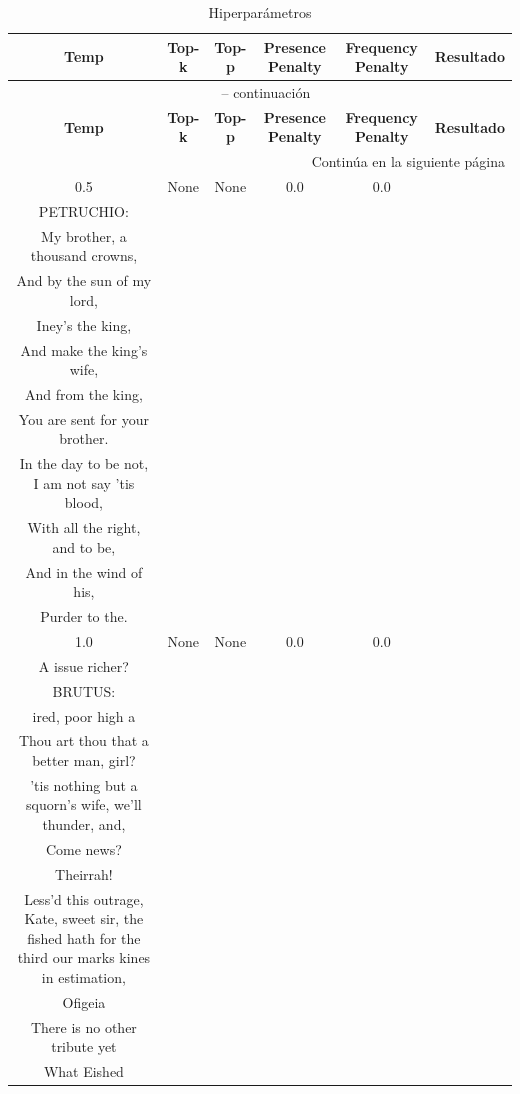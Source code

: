 \documentclass[11pt]{book}
\begin{document}
\begin{longtable}{ccccc >{\raggedright\arraybackslash}p{8cm}}
    \caption{Hiperparámetros}
    \label{tab:resultados_validacion_shakespeare} \\
    \toprule
    \textbf{Temp} & \textbf{Top-k} & \textbf{Top-p} &
    \textbf{Presence Penalty} & \textbf{Frequency Penalty} & \textbf{Resultado} \\
    \midrule
    \endfirsthead
    
    \multicolumn{6}{c}{{\tablename\ \thetable{} -- continuación}} \\
    \toprule
    \textbf{Temp} & \textbf{Top-k} & \textbf{Top-p} &
    \textbf{Presence Penalty} & \textbf{Frequency Penalty} & \textbf{Resultado} \\
    \midrule
    \endhead
    
    \bottomrule
    \multicolumn{6}{r}{{Continúa en la siguiente página}} \\
    \endfoot
    
    \bottomrule
    \endlastfoot
    
    0.5 & None & None & 0.0 & 0.0 &
    \begin{tcolorbox}[breakable, enhanced jigsaw, frame hidden, colback=white, boxrule=0pt]
    KING RICHARD:\\
    PETRUCHIO:\\
    My brother, a thousand crowns,\\
    And by the sun of my lord,\\
    Iney’s the king,\\
    And make the king’s wife,\\
    And from the king,\\
    You are sent for your brother.\\
    In the day to be not, I am not say ’tis blood,\\
    With all the right, and to be,\\
    And in the wind of his,\\
    Purder to the.
    \end{tcolorbox} \\
    
    1.0 & None & None & 0.0 & 0.0 &
    \begin{tcolorbox}[breakable, enhanced jigsaw, frame hidden, colback=white, boxrule=0pt]
    KING RICHARD:\\
    A issue richer?\\
    BRUTUS:\\
    ired, poor high a\\
    Thou art thou that a better man, girl?\\
    'tis nothing but a squorn's wife, we'll thunder, and,\\
    Come news?\\
    Theirrah!\\
    Less'd this outrage, Kate, sweet sir, the fished hath for the third our marks kines in estimation,\\
    Ofigeia\\
    There is no other tribute yet\\
    What Eished
    \end{tcolorbox} \\
    

\end{longtable}
\end{document}
